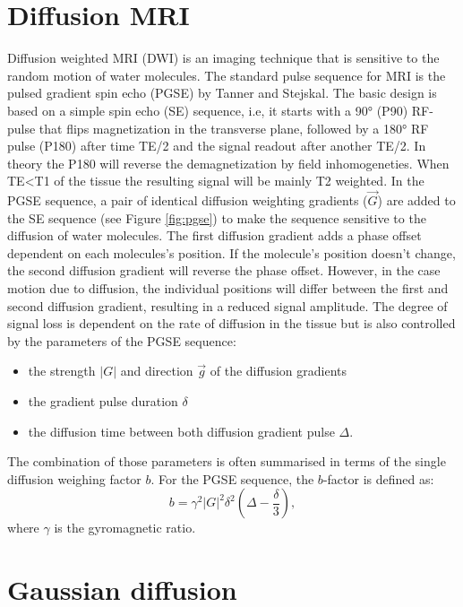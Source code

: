 \section{Diffusion MRI}
Diffusion weighted MRI (DWI) is an imaging technique that is sensitive to the random motion of water molecules. The standard pulse sequence for MRI is the pulsed gradient spin echo (PGSE) by Tanner and Stejskal\cite{tanner65}. The basic design is based on a simple spin echo (SE) sequence, i.e, it starts with a 90° (P90) RF-pulse that flips magnetization in the transverse plane, followed by a 180° RF pulse (P180) after time TE/2 and the signal readout after another TE/2. In theory the P180 will reverse the demagnetization by field inhomogeneties. When TE<T1 of the tissue the resulting signal will be mainly T2 weighted. In the PGSE sequence, a pair of identical diffusion weighting gradients ($\vec{G}$) are added to the SE sequence (see Figure \ref{fig:pgse}) to make the sequence sensitive to the diffusion of water molecules. The first diffusion gradient adds a phase offset dependent on each molecules's position. If the molecule's position doesn't change, the second diffusion gradient will reverse the phase offset. However, in the case motion due to diffusion, the individual positions will differ between the first and second diffusion gradient, resulting in a reduced signal amplitude. The degree of signal loss is dependent on the rate of diffusion in the tissue but is also controlled by the parameters of the PGSE sequence:
\begin{itemize}
	\item the strength $|G|$ and direction $\vec{g}$ of the diffusion gradients
	\item the gradient pulse duration $\delta$
	\item the diffusion time between both diffusion gradient pulse $\Delta$.
\end{itemize}
The combination of those parameters is often summarised in terms of the single diffusion weighing factor $b$. For the PGSE sequence, the $b$-factor is defined as:
\begin{equation}
	b = \gamma^2|G|^2\delta^2(\Delta-\frac{\delta}{3}),
\end{equation}
where $\gamma$ is the gyromagnetic ratio.

\section{Gaussian diffusion}
